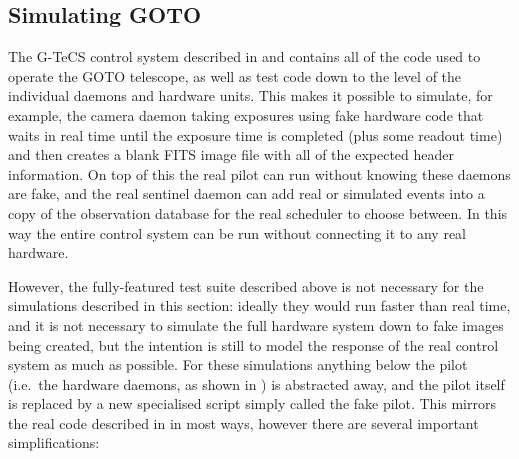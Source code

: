\subsection{Simulating GOTO}
\label{sec:goto_sims}
\begin{colsection}

The G-TeCS control system described in  and  contains all of the code used to operate the GOTO telescope, as well as test code down to the level of the individual daemons and hardware units. This makes it possible to simulate, for example, the camera daemon taking exposures using fake hardware code that waits in real time until the exposure time is completed (plus some readout time) and then creates a blank FITS image file with all of the expected header information. On top of this the real pilot can run without knowing these daemons are fake, and the real sentinel daemon can add real or simulated events into a copy of the observation database for the real scheduler to choose between. In this way the entire control system can be run without connecting it to any real hardware.

However, the fully-featured test suite described above is not necessary for the simulations described in this section: ideally they would run faster than real time, and it is not necessary to simulate the full hardware system down to fake images being created, but the intention is still to model the response of the real control system as much as possible. For these simulations anything below the pilot (i.e.\ the hardware daemons, as shown in ) is abstracted away, and the pilot itself is replaced by a new specialised script simply called the fake pilot. This mirrors the real code described in  in most ways, however there are several important simplifications:


\end{colsection}
